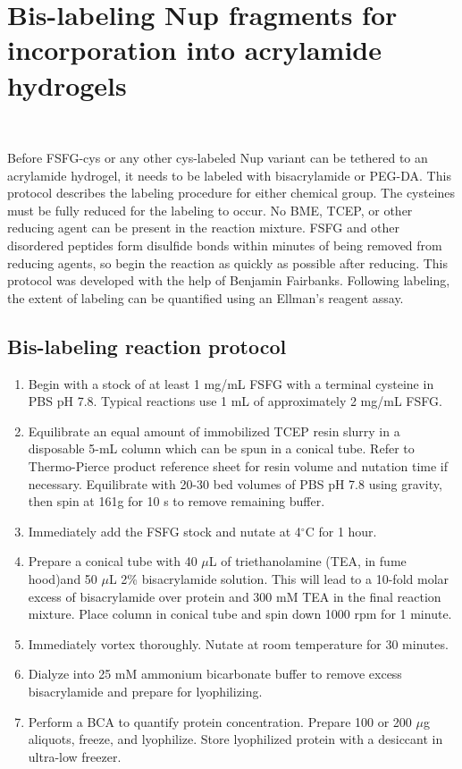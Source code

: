 \chapter{Bis-labeling Nup fragments for incorporation into acrylamide hydrogels}~\label{appx:bis-labeling}

Before FSFG-cys or any other cys-labeled Nup variant can be tethered to an acrylamide hydrogel, it needs to be labeled with bisacrylamide or PEG-DA.  This protocol describes the labeling procedure for either chemical group.  The cysteines must be fully reduced for the labeling to occur.  No BME, TCEP, or other reducing agent can be present in the reaction mixture.  FSFG and other disordered peptides form disulfide bonds within minutes of being removed from reducing agents, so begin the reaction as quickly as possible after reducing.  This protocol was developed with the help of Benjamin Fairbanks.  Following labeling, the extent of labeling can be quantified using an Ellman's reagent assay.

\section{Bis-labeling reaction protocol}

\begin{enumerate}
\item Begin with a stock of at least 1 mg/mL FSFG with a terminal cysteine in PBS pH 7.8.  Typical reactions use 1 mL of approximately 2 mg/mL FSFG.
\item Equilibrate an equal amount of immobilized TCEP resin slurry in a disposable 5-mL column which can be spun in a conical tube.  Refer to Thermo-Pierce product reference sheet for resin volume and nutation time if necessary.  Equilibrate with 20-30 bed volumes of PBS pH 7.8 using gravity, then spin at 161g for 10 s to remove remaining buffer.
\item Immediately add the FSFG stock and nutate at 4$^\circ$C for 1 hour.
\item Prepare a conical tube with 40 $\mu$L of triethanolamine (TEA, in fume hood)and 50 $\mu$L 2\% bisacrylamide solution.  This will lead to a 10-fold molar excess of bisacrylamide over protein and 300 mM TEA in the final reaction mixture. Place column in conical tube and spin down 1000 rpm for 1 minute.
\item Immediately vortex thoroughly.  Nutate at room temperature for 30 minutes.
\item Dialyze into 25 mM ammonium bicarbonate buffer to remove excess bisacrylamide and prepare for lyophilizing.
\item Perform a BCA to quantify protein concentration. Prepare 100 or 200 $\mu$g aliquots, freeze, and lyophilize.  Store lyophilized protein with a desiccant in ultra-low freezer.
\end{enumerate}


